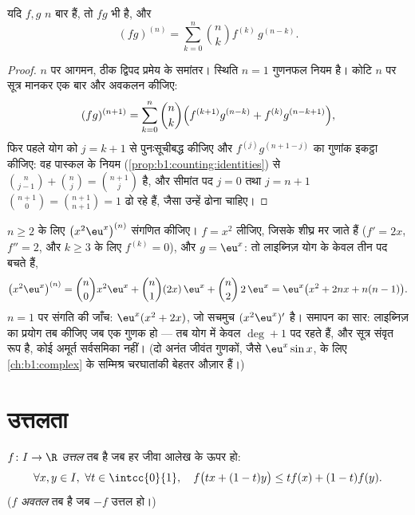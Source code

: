\begin{theorem}[लाइब्निज़ सूत्र]\label{thm:b1:derivative:leibniz}
यदि $f, g$ $n$ बार  हैं, तो $fg$ भी है, और
\[
(fg)^{(n)} = \sum_{k=0}^{n} \binom nk f^{(k)}\, g^{(n-k)} .
\]
\end{theorem}

\begin{proof}
$n$ पर आगमन, ठीक द्विपद प्रमेय के समांतर। स्थिति $n = 1$ गुणनफल नियम है।
कोटि $n$ पर सूत्र मानकर एक बार और अवकलन कीजिए:
\[
(fg)^{(n+1)} = \sum_{k=0}^{n} \binom nk
\Bigl( f^{(k+1)} g^{(n-k)} + f^{(k)} g^{(n-k+1)} \Bigr),
\]
फिर पहले योग को $j = k + 1$ से पुनःसूचीबद्ध कीजिए और $f^{(j)} g^{(n+1-j)}$
का गुणांक इकट्ठा कीजिए: वह पास्कल के नियम
(\cref{prop:b1:counting:identities}) से $\binom{n}{j-1} + \binom nj =
\binom{n+1}{j}$ है, और सीमांत पद $j = 0$ तथा $j = n + 1$ $\binom{n+1}{0} =
\binom{n+1}{n+1} = 1$ ढो रहे हैं, जैसा उन्हें ढोना चाहिए।
\end{proof}

\begin{example}[लाइब्निज़ काम पर]\label{ex:b1:derivative:leibnizaction}
$n \geq 2$ के लिए $\bigl(x^2 \eu^x\bigr)^{(n)}$ संगणित कीजिए। $f = x^2$
लीजिए, जिसके  शीघ्र मर जाते हैं ($f' = 2x$, $f'' = 2$, और $k \geq 3$ के
लिए $f^{(k)} = 0$), और $g = \eu^x$: तो लाइब्निज़ योग के केवल तीन पद बचते
हैं,
\[
\bigl(x^2\eu^x\bigr)^{(n)}
= \binom n0 x^2 \eu^x + \binom n1 (2x)\,\eu^x + \binom n2\,
2\,\eu^x
= \eu^x\bigl(x^2 + 2nx + n(n-1)\bigr).
\]
$n = 1$ पर संगति की जाँच: $\eu^x(x^2 + 2x)$, जो सचमुच $(x^2\eu^x)'$ है।
समापन का सार: लाइब्निज़ का प्रयोग तब कीजिए जब एक गुणक  हो --- तब योग
में केवल $\deg + 1$ पद रहते हैं, और सूत्र संवृत रूप है, कोई अमूर्त सर्वसमिका
नहीं। (दो अनंत जीवंत गुणकों, जैसे $\eu^x\sin x$, के लिए \cref{ch:b1:complex}
के सम्मिश्र चरघातांकी बेहतर औज़ार हैं।)
\end{example}

\section{उत्तलता}

\begin{definition}\label{def:b1:derivative:convex}
$f \colon I \to \R$ \emph{उत्तल} तब है जब हर जीवा आलेख के
ऊपर हो:
\[
\forall x, y \in I,\ \forall t \in \intcc{0}{1}, \quad
f\bigl(tx + (1-t)y\bigr) \leq t f(x) + (1-t) f(y).
\]
($f$ \emph{अवतल} तब है जब $-f$ उत्तल हो।)
\end{definition}

